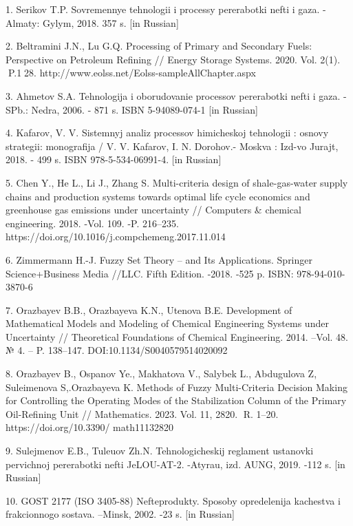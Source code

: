 \begin{noparindent}

1. Serikov T.P. Sovremennye tehnologii i processy pererabotki nefti i
gaza. - Almaty: Gylym, 2018. 357 s. {[}in Russian{]}

2. Beltramini J.N., Lu G.Q. Processing of Primary and Secondary Fuels:
Perspective on Petroleum Refining // Energy Storage Systems. 2020. Vol.
2(1). P.128. http://www.eolss.net/Eolss-sampleAllChapter.aspx

3. Ahmetov S.A. Tehnologija i oborudovanie processov pererabotki nefti i
gaza. - SPb.: Nedra, 2006. - 871 s. ISBN 5-94089-074-1 {[}in Russian{]}

4. Kafarov, V. V. Sistemnyj analiz processov himicheskoj tehnologii :
osnovy strategii: monografija / V. V. Kafarov, I. N. Dorohov.- Moskva :
Izd-vo Jurajt, 2018. - 499 s. ISBN 978-5-534-06991-4. {[}in Russian{]}

5. Chen Y., He L., Li J., Zhang S. Multi-criteria design of
shale-gas-water supply chains and production systems towards optimal
life cycle economics and greenhouse gas emissions under uncertainty //
Computers \& chemical engineering. 2018. -Vol. 109. -P. 216--235.
https://doi.org/10.1016/j.compchemeng.2017.11.014

6. Zimmermann H.-J. Fuzzy Set Theory -- and Its Applications. Springer
Science+Business Media //LLC. Fifth Edition. -2018. -525 p. ISBN:
978-94-010-3870-6

7. Orazbayev B.B., Orazbayeva K.N., Utenova B.E. Development of
Mathematical Models and Modeling of Chemical Engineering Systems under
Uncertainty // Theoretical Foundations of Chemical Engineering. 2014.
--Vol. 48. № 4. -- P. 138--147. DOI:10.1134/S0040579514020092

8. Orazbayev B., Ospanov Ye., Makhatova V., Salybek L., Abdugulova Z,
Suleimenova S,.Orazbayeva K. Methods of Fuzzy Multi-Criteria Decision
Making for Controlling the Operating Modes of the Stabilization Column
of the Primary Oil-Refining Unit // Mathematics. 2023. Vol. 11, 2820.
R. 1--20. \\https://doi.org/10.3390/ math11132820

9. Sulejmenov E.B., Tuleuov Zh.N. Tehnologicheskij reglament ustanovki
pervichnoj pererabotki nefti JeLOU-AT-2. -Atyrau, izd. AUNG, 2019. -112
s. {[}in Russian{]}

10. GOST 2177 (ISO 3405-88) Nefteprodukty. Sposoby opredelenija
kachestva i frakcionnogo sostava. --Minsk, 2002. -23 s. {[}in Russian{]}


\end{noparindent}
